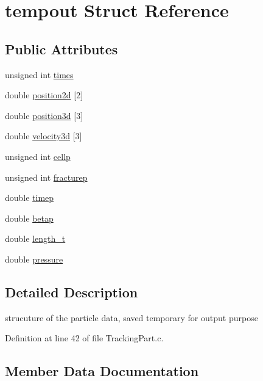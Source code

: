 \hypertarget{structtempout}{}\section{tempout Struct Reference}
\label{structtempout}
\subsection*{Public Attributes}
\begin{DoxyCompactItemize}
\item 
unsigned int \mbox{\hyperlink{structtempout_a7f6e4c17b4f10a6d9bbdbf02f794217f}{times}}
\item 
double \mbox{\hyperlink{structtempout_a766494dc449f55f34cbb0404c0b3823a}{position2d}} \mbox{[}2\mbox{]}
\item 
double \mbox{\hyperlink{structtempout_a389fe2c017890281652d5abc6a608f91}{position3d}} \mbox{[}3\mbox{]}
\item 
double \mbox{\hyperlink{structtempout_abc348407152ab976840ee50d46164a83}{velocity3d}} \mbox{[}3\mbox{]}
\item 
unsigned int \mbox{\hyperlink{structtempout_a959460ad7a7becc867670385c6540dcd}{cellp}}
\item 
unsigned int \mbox{\hyperlink{structtempout_aae2e06cd449b82338982dfcbeaacfe13}{fracturep}}
\item 
double \mbox{\hyperlink{structtempout_af198ba0015680ea5c222caca83cc4d7a}{timep}}
\item 
double \mbox{\hyperlink{structtempout_aaadaf59e6458b77cd74d6e42b7f946bf}{betap}}
\item 
double \mbox{\hyperlink{structtempout_a56ef223d6bce6cfa895728b327d2bd82}{length\+\_\+t}}
\item 
double \mbox{\hyperlink{structtempout_aac9d83b4e041609a40d2f5c2cf1d1bb5}{pressure}}
\end{DoxyCompactItemize}


\subsection{Detailed Description}
strucuture of the particle data, saved temporary for output purpose 

Definition at line 42 of file Tracking\+Part.\+c.



\subsection{Member Data Documentation}
\mbox{\label{structtempout_aaadaf59e6458b77cd74d6e42b7f946bf}} 
